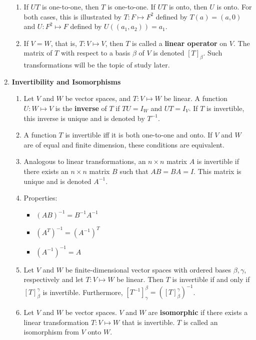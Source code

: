 \documentclass[10pt]{article}
\begin{document}
\begin{multicols*}{2}
\begin{enumerate}
\begin{enumerate}
        \item If $UT$ is one-to-one, then $T$ is one-to-one. If $UT$ is onto, then $U$ is onto. For both cases, this is illustrated by $T: F \mapsto F^2$ defined by $T(a) = (a, 0)$ and $U: F^2 \mapsto F$ defined by $U((a_1,a_2)) = a_1$.
        
        \item If $V=W$, that is, $T: V \mapsto V$, then $T$ is called a \textbf{linear operator} on $V$. The matrix of $T$ with respect to a basis $\beta$ of $V$ is denoted $[T]_\beta$. Such transformations will be the topic of study later.
    \end{enumerate}
    
    \item \textbf{Invertibility and Isomorphisms} 
    \begin{enumerate}
        \item Let $V$ and $W$ be vector spaces, and $T:V\mapsto W$ be linear. A function $U:W\mapsto V$ is the \textbf{inverse} of $T$ if $TU = I_W$ and $UT = I_V$. If $T$ is invertible, this inverse is unique and is denoted by $T^{-1}$.
        \item A function $T$ is invertible iff it is both one-to-one and onto. If $V$ and $W$ are of equal and finite dimension, these conditions are equivalent.
        
        \item Analogous to linear transformations, an $n \times n$ matrix $A$ is invertible if there exists an $n \times n$ matrix $B$ such that $AB = BA = I$. This matrix is unique and is denoted $A^{-1}$.
        
        \item Properties:
        \begin{itemize}
            \item $(AB)^{-1} = B^{-1}A^{-1}$
            \item $(A^T)^{-1} = (A^{-1})^T$
            \item $(A^{-1})^{-1} = A$
        \end{itemize}
        
        \item Let $V$ and $W$ be finite-dimensional vector spaces with ordered bases $\beta,\gamma$, respectively and let $T: V \mapsto W$ be linear. Then $T$ is invertible if and only if $[T]_\beta^\gamma$ is invertible. Furthermore, $[T^{-1}]_\gamma^\beta = ([T]_\beta^\gamma)^{-1}$.
        
        \item Let $V$ and $W$ be vector spaces. $V$ and $W$ are \textbf{isomorphic} if there exists a linear transformation $T:V \mapsto W$ that is invertible. $T$ is called an isomorphism from $V$ onto $W$.
        

\end{enumerate}
\end{enumerate}
\end{multicols*}
\end{document}
